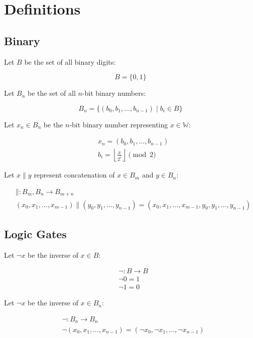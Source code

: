 \documentclass[fleqn]{article}
\begin{document}
\section{Definitions}

\subsection{Binary}

Let $B$ be the set of all binary digits:

\[ B = \{0, 1\} \]

Let $B_n$ be the set of all $n$-bit binary numbers:

\[ B_n = \{ (b_0, b_1, \dots, b_{n-1}) \mid b_i \in B \} \]

Let $x_n \in B_n$ be the $n$-bit binary number representing $x \in \mathbb{W}$:

\begin{align*}
&x_n = (b_0, b_1, \dots, b_{n-1}) \\
&b_i = \left\lfloor \frac{x}{2^i} \right\rfloor \pmod 2
\end{align*}

Let $x \mathbin{\|} y$ represent concatenation of $x \in B_m$ and $y \in B_n$:

\begin{align*}
&\mathbin{\|} : B_m, B_n \to B_{m+n} \\
&(x_0, x_1, \dots, x_{m-1}) \mathbin{\|} (y_0, y_1, \dots, y_{n-1}) = (x_0, x_1, \dots, x_{m-1}, y_0, y_1, \dots, y_{n-1})
\end{align*}

\subsection{Logic Gates}

Let $\neg x$ be the inverse of $x \in B$:

\begin{align*}
&\neg : B \to  B \\
&\neg 0 = 1 \\
&\neg 1 = 0
\end{align*}

Let $\neg x$ be the inverse of $x \in B_n$:

\begin{align*}
&\neg : B_n \to B_n \\
&\neg (x_0, x_1, \dots, x_{n-1}) = (\neg x_0, \neg x_1, \dots, \neg x_{n-1})
\end{align*}
\end{document}
